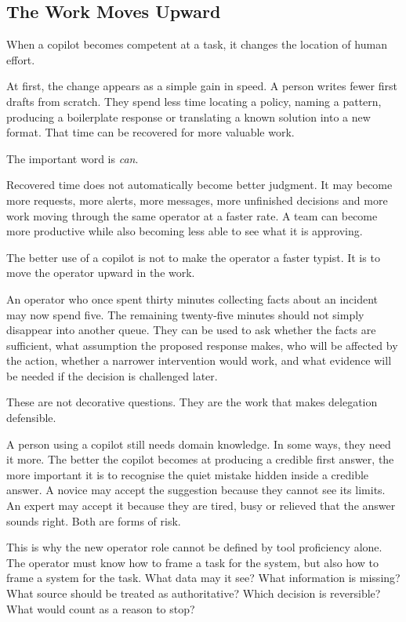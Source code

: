 \subsection{The Work Moves Upward}\label{the-work-moves-upward}

When a copilot becomes competent at a task, it changes the location of
human effort.

At first, the change appears as a simple gain in speed. A person writes
fewer first drafts from scratch. They spend less time locating a policy,
naming a pattern, producing a boilerplate response or translating a
known solution into a new format. That time can be recovered for more
valuable work.

The important word is \emph{can}.

Recovered time does not automatically become better judgment. It may
become more requests, more alerts, more messages, more unfinished
decisions and more work moving through the same operator at a faster
rate. A team can become more productive while also becoming less able to
see what it is approving.

The better use of a copilot is not to make the operator a faster typist.
It is to move the operator upward in the work.

An operator who once spent thirty minutes collecting facts about an
incident may now spend five. The remaining twenty-five minutes should
not simply disappear into another queue. They can be used to ask whether
the facts are sufficient, what assumption the proposed response makes,
who will be affected by the action, whether a narrower intervention
would work, and what evidence will be needed if the decision is
challenged later.

These are not decorative questions. They are the work that makes
delegation defensible.

A person using a copilot still needs domain knowledge. In some ways,
they need it more. The better the copilot becomes at producing a
credible first answer, the more important it is to recognise the quiet
mistake hidden inside a credible answer. A novice may accept the
suggestion because they cannot see its limits. An expert may accept it
because they are tired, busy or relieved that the answer sounds right.
Both are forms of risk.

This is why the new operator role cannot be defined by tool proficiency
alone. The operator must know how to frame a task for the system, but
also how to frame a system for the task. What data may it see? What
information is missing? What source should be treated as authoritative?
Which decision is reversible? What would count as a reason to stop?

